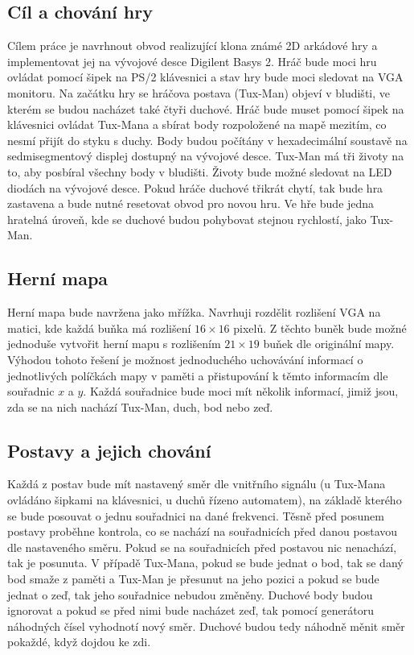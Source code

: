 \documentclass{report}
\begin{document}
\subsection{Cíl a chování hry}\label{sec:cilachovani}
Cílem práce je navrhnout obvod realizující klona známé 2D arkádové hry a implementovat jej na vývojové desce Digilent Basys 2. Hráč bude moci hru ovládat pomocí šipek na PS/2 klávesnici a stav hry bude moci sledovat na VGA monitoru. Na začátku hry se hráčova postava (Tux-Man) objeví v bludišti, ve kterém se budou nacházet také čtyři duchové. Hráč bude muset pomocí šipek na klávesnici ovládat Tux-Mana a sbírat body rozpoložené na mapě mezitím, co nesmí přijít do styku s duchy. Body budou počítány v hexadecimální soustavě na sedmisegmentový displej dostupný na vývojové desce. Tux-Man má tři životy na to, aby posbíral všechny body v bludišti. Životy bude možné sledovat na LED diodách na vývojové desce. Pokud hráče duchové třikrát chytí, tak bude hra zastavena a bude nutné resetovat obvod pro novou hru. Ve hře bude jedna hratelná úroveň, kde se duchové budou pohybovat stejnou rychlostí, jako Tux-Man.
\subsection{Herní mapa}\label{sec:hernimapanavrh}
Herní mapa bude navržena jako mřížka. Navrhuji rozdělit rozlišení VGA na matici, kde každá buňka má rozlišení $16×16$ pixelů. Z těchto buněk bude možné jednoduše vytvořit herní mapu s rozlišením $21×19$ buňek dle originální mapy. Výhodou tohoto řešení je možnost jednoduchého uchovávání informací o jednotlivých políčkách mapy v paměti a přistupování k těmto informacím dle souřadnic $x$ a $y$. Každá souřadnice bude moci mít několik informací, jimiž jsou, zda se na nich nachází Tux-Man, duch, bod nebo zeď. 
\subsection{Postavy a jejich chování}\label{sec:postavyachovani}
Každá z postav bude mít nastavený směr dle vnitřního signálu (u Tux-Mana ovládáno šipkami na klávesnici, u duchů řízeno automatem), na základě kterého se bude posouvat o jednu souřadnici na dané frekvenci. Těsně před posunem postavy proběhne kontrola, co se nachází na souřadnicích před danou postavou dle nastaveného směru. Pokud se na souřadnicích před postavou nic nenachází, tak je posunuta. V případě Tux-Mana, pokud se bude jednat o bod, tak se daný bod smaže z paměti a Tux-Man je přesunut na jeho pozici a pokud se bude jednat o zeď, tak jeho souřadnice nebudou změněny. Duchové body budou ignorovat a pokud se před nimi bude nacházet zeď, tak pomocí generátoru náhodných čísel vyhodnotí nový směr. Duchové budou tedy náhodně měnit směr pokaždé, když dojdou ke zdi.
\end{document}
